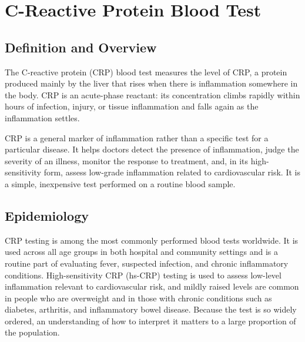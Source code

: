 \chapter{C-Reactive Protein Blood Test}

\section*{Definition and Overview}
The C-reactive protein (CRP) blood test measures the level of CRP, a protein produced mainly by the liver that rises when there is inflammation somewhere in the body. CRP is an acute-phase reactant: its concentration climbs rapidly within hours of infection, injury, or tissue inflammation and falls again as the inflammation settles.

CRP is a general marker of inflammation rather than a specific test for a particular disease. It helps doctors detect the presence of inflammation, judge the severity of an illness, monitor the response to treatment, and, in its high-sensitivity form, assess low-grade inflammation related to cardiovascular risk. It is a simple, inexpensive test performed on a routine blood sample.

\section*{Epidemiology}
CRP testing is among the most commonly performed blood tests worldwide. It is used across all age groups in both hospital and community settings and is a routine part of evaluating fever, suspected infection, and chronic inflammatory conditions. High-sensitivity CRP (hs-CRP) testing is used to assess low-level inflammation relevant to cardiovascular risk, and mildly raised levels are common in people who are overweight and in those with chronic conditions such as diabetes, arthritis, and inflammatory bowel disease. Because the test is so widely ordered, an understanding of how to interpret it matters to a large proportion of the population.

